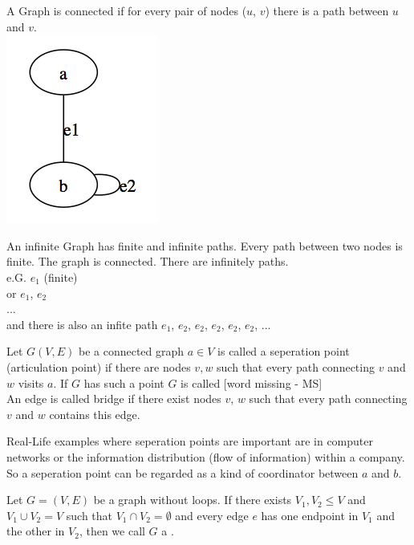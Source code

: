 A Graph is connected if for every pair of nodes ($u$, $v$) there is a path between $u$ and $v$.\\

\includegraphics[scale=0.45]{diagrams/Chapter1_Example6}

An infinite Graph has finite and infinite paths. Every path between two nodes is finite. The graph is connected. There are infinitely paths.\\
e.G. $e{_1}$ (finite)\\
or $e{_1}$, $e{_2}$\\
...\\
and there is also an infite path $e{_1}$, $e{_2}$, $e{_2}$, $e{_2}$, $e{_2}$, $e{_2}$, ...\\


\begin{definition}
    Let $G(V,E)$ be a connected graph $a \in V$ is called a seperation point (articulation point) if there are nodes $v, w$ such that every path connecting $v$ and $w$ visits $a$. If $G$ has such a point $G$ is called [word missing - MS]\\
    An edge is called bridge if there exist nodes $v$, $w$ such that every path connecting $v$ and $w$ contains this edge.
\end{definition}

\begin{example*}
Real-Life examples where seperation points are important are in computer networks or the information distribution (flow of information) within a company. So a seperation point can be regarded as a kind of coordinator between $a$ and $b$.
\end{example*}

\begin{definition}
    Let $G = (V,E)$ be a graph without loops. If there exists $V_{1}, V_{2} \leq V$ and $V_{1} \cup V_{2} = V$
    such that $V_{1} \cap V_{2} = \emptyset$ and every edge $e$ has one endpoint in $V{_1}$ and the other in $V_{2}$,
    then we call $G$ a .
\end{definition}

